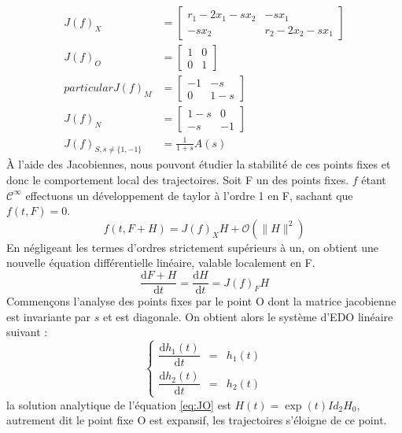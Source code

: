 \documentclass{wsdcr}
\begin{document}
\begin{equation}
\begin{aligned}
J(f)_X &= \begin{bmatrix}r_1-2x_1-sx_2&-sx_1\\-sx_2&r_2-2x_2-sx_1\end{bmatrix} \\
J(f)_{O} &= \begin{bmatrix}1&0\\0&1\end{bmatrix} \\particular
J(f)_{M} &= \begin{bmatrix}-1&-s\\0&1-s\end{bmatrix} \\
J(f)_{N} &= \begin{bmatrix}1-s&0\\-s&-1\end{bmatrix} \\
J(f)_{S,s\neq \{1,-1\}} &= \frac{1}{1+s}A(s)
\end{aligned}
\end{equation}
À l'aide des Jacobiennes, nous pouvont étudier la stabilité de ces points fixes et donc le comportement local des trajectoires. Soit F un des points fixes. $f$ étant $\mathcal{C}^\infty$ effectuons un développement de taylor à l'ordre 1 en F, sachant que $f(t,F)=0$.
\begin{equation}
f(t,F+H)=J(f)_XH + \mathcal{O}(\|H\|^2) 
\end{equation}
En négligeant les termes d'ordres strictement supérieurs à un, on obtient une nouvelle équation différentielle linéaire, valable localement en F.
\begin{equation}
{\dfrac {\mathrm {d} F+H}{\mathrm {d} t}}={\dfrac {\mathrm {d} H}{\mathrm {d} t}}=J(f)_FH
\end{equation}
Commençons l'analyse des points fixes par le point O dont la matrice jacobienne est invariante par $s$ et est diagonale. On obtient alors le système d'EDO linéaire suivant : 
\begin{equation}
\left\{
{\begin{array}{ccc}{\dfrac {\mathrm {d} h_1(t)}{\mathrm {d} t}}&=&h_1(t)\\{\dfrac {\mathrm {d} h_2(t)}{\mathrm {d} t}}&=&h_2(t)\end{array}}
\right.
\label{eq:JO}
\end{equation}
la solution analytique de l'équation \ref{eq:JO} est $H(t)=\exp(t)Id_2H_0$, autrement dit le point fixe O est expansif, les trajectoires s'éloigne de ce point. \\
\end{document}
